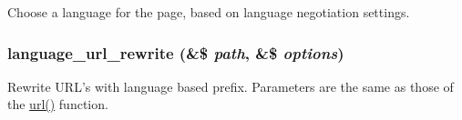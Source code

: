 Choose a language for the page, based on language negotiation settings. \hypertarget{language_8inc_4b859d3f6ab4515f228094edcd6c78c8}{
\subsubsection[{language\_\-url\_\-rewrite}]{\setlength{\rightskip}{0pt plus 5cm}language\_\-url\_\-rewrite (\&\$ {\em path}, \/  \&\$ {\em options})}}
\label{language_8inc_4b859d3f6ab4515f228094edcd6c78c8}


Rewrite URL's with language based prefix. Parameters are the same as those of the \hyperlink{common_8inc_7ef60c766e2d09e18b866dacf6b9eb1f}{url()} function. 